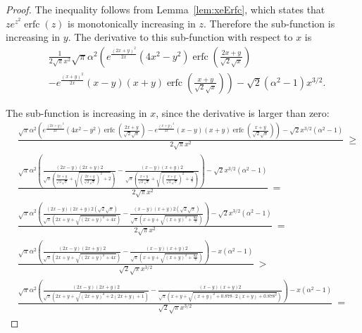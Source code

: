 \documentclass{article}
\renewcommand{\geq}{\geqslant}
\DeclareMathOperator{\erfc}{erfc}
\begin{document}
\begin{proof}
The inequality follows from Lemma~\ref{lem:xeErfc}, which states that 
$z e^{z^2} \erfc(z)$ is monotonically increasing in $z$.
Therefore the sub-function is increasing in $y$. The derivative to this sub-function with respect to $x$ is
\begin{align}
&\frac{1}{2 \sqrt{\pi } x^2} \sqrt{\pi } \alpha ^2 \left(e^{\frac{(2 x+y)^2}{2 x}} \left(4 x^2-y^2\right) \erfc\left(\frac{2 x+y}{\sqrt{2} \sqrt{x}}\right) \right. \\ \nonumber
& \left. - e^{\frac{(x+y)^2}{2 x}} (x-y) (x+y) \erfc\left(\frac{x+y}{\sqrt{2} \sqrt{x}}\right)\right)-\sqrt{2} \left(\alpha ^2-1\right) x^{3/2} .
\end{align}

The sub-function is increasing in $x$, since the
derivative is larger than zero:
\begin{align}
&\frac{\sqrt{\pi } \alpha ^2 \left(e^{\frac{(2 x+y)^2}{2 x}} \left(4 x^2-y^2\right) \erfc\left(\frac{2 x+y}{\sqrt{2} \sqrt{x}}\right)-e^{\frac{(x+y)^2}{2 x}} (x-y) (x+y) \erfc\left(\frac{x+y}{\sqrt{2} \sqrt{x}}\right)\right)-\sqrt{2} x^{3/2} \left(\alpha ^2-1\right)}{2 \sqrt{\pi } x^2}\ \geq\\ \nonumber 
&\frac{\sqrt{\pi } \alpha ^2 \left(\frac{(2 x-y) (2 x+y) 2}{\sqrt{\pi } \left(\frac{2 x+y}{\sqrt{2} \sqrt{x}}+\sqrt{\left(\frac{2 x+y}{\sqrt{2} \sqrt{x}}\right)^2+2}\right)}-\frac{(x-y) (x+y) 2}{\sqrt{\pi } \left(\frac{x+y}{\sqrt{2} \sqrt{x}}+\sqrt{\left(\frac{x+y}{\sqrt{2} \sqrt{x}}\right)^2+\frac{4}{\pi }}\right)}\right)-\sqrt{2} x^{3/2} \left(\alpha ^2-1\right)}{2 \sqrt{\pi } x^2}\ =
  \\ \nonumber 
&\frac{\sqrt{\pi } \alpha ^2 \left(\frac{(2 x-y) (2 x+y) 2 \left(\sqrt{2} \sqrt{x}\right)}{\sqrt{\pi } \left(2 x+y+\sqrt{(2 x+y)^2+4 x}\right)}-\frac{(x-y) (x+y) 2 \left(\sqrt{2} \sqrt{x}\right)}{\sqrt{\pi } \left(x+y+\sqrt{(x+y)^2+\frac{8 x}{\pi }}\right)}\right)-\sqrt{2} x^{3/2} \left(\alpha ^2-1\right)}{2 \sqrt{\pi } x^2}\ =
  \\ \nonumber 
&\frac{\sqrt{\pi } \alpha ^2 \left(\frac{(2 x-y) (2 x+y) 2}{\sqrt{\pi } \left(2 x+y+\sqrt{(2 x+y)^2+4 x}\right)}-\frac{(x-y) (x+y) 2}{\sqrt{\pi } \left(x+y+\sqrt{(x+y)^2+\frac{8 x}{\pi }}\right)}\right)-x \left(\alpha ^2-1\right)}{\sqrt{2} \sqrt{\pi } x^{3/2}}\ >
  \\ \nonumber 
&\frac{\sqrt{\pi } \alpha ^2 \left(\frac{(2 x-y) (2 x+y) 2}{\sqrt{\pi } \left(2 x+y+\sqrt{(2 x+y)^2+2 (2 x+y)+1}\right)}-\frac{(x-y) (x+y) 2}{\sqrt{\pi } \left(x+y+\sqrt{(x+y)^2+0.878 \cdot 2 (x+y)+0.878^2}\right)}\right)-x \left(\alpha ^2-1\right)}{\sqrt{2} \sqrt{\pi } x^{3/2}}\ =

\end{align}
\end{proof}
\end{document}
